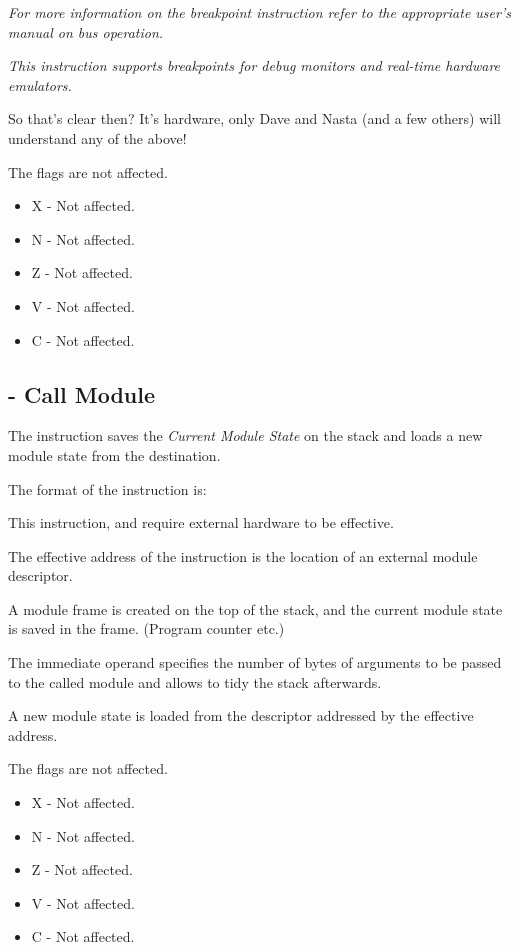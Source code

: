 \emph{For more information on the breakpoint instruction refer to the appropriate user’s manual on bus operation.}

\emph{This instruction supports breakpoints for debug monitors and real-time hardware emulators.}

So that's clear then? It's hardware, only Dave and Nasta (and a few others) will understand any of the above!

The flags are not affected.

\begin{itemize}
    \item X - Not affected.
    \item N - Not affected.
    \item Z - Not affected.
    \item V - Not affected.
    \item C - Not affected.
\end{itemize}


\subsection{ - Call Module}

The  instruction saves the \emph{Current Module State} on the stack and loads a new module state from the destination.

The format of the instruction is:


This instruction, and  require external hardware to be effective. 

The effective address of the instruction is the location of an external module
descriptor. 

A module frame is created on the top of the stack, and the current module
state is saved in the frame. (Program counter etc.)

The immediate operand specifies the number of bytes of arguments to be passed to the called module and allows  to tidy the stack afterwards.

A new module state is loaded from the descriptor addressed by the effective address.

The flags are not affected.

\begin{itemize}
	\item X - Not affected.
	\item N - Not affected.
	\item Z - Not affected.
	\item V - Not affected.
	\item C - Not affected.
\end{itemize}

